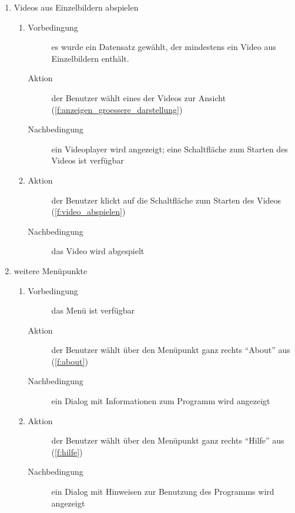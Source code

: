 \begin{enumerate} [label=\bfseries /TS \arabic*0/, leftmargin=*]
	\item Videos aus Einzelbildern abspielen \label{ts:video_abspielen}
	\begin{enumerate}[leftmargin=0pt]
		\item
		\begin{description}
			\item[Vorbedingung] es wurde ein Datensatz gewählt, der mindestens ein Video aus Einzelbildern enthält.
			\item[Aktion] der Benutzer wählt eines der Videos zur Ansicht (\ref{f:anzeigen_groessere_darstellung})
			\item[Nachbedingung] ein Videoplayer wird angezeigt; eine Schaltfläche zum Starten des Videos ist verfügbar
		\end{description}
		\item
		\begin{description}
			\item[Aktion] der Benutzer klickt auf die Schaltfläche zum Starten des Videos (\ref{f:video_abspielen})
			\item[Nachbedingung] das Video wird abgespielt
		\end{description}
	\end{enumerate}

	\item weitere Menüpunkte \label{ts:weitere_menuepunkte}
	\begin{enumerate}[leftmargin=0pt]
		\item
		\begin{description}
			\item[Vorbedingung] das Menü ist verfügbar
			\item[Aktion] der Benutzer wählt über den Menüpunkt ganz rechts \enquote{About} aus (\ref{f:about})
			\item[Nachbedingung] ein \gls{Dialog} mit Informationen zum Programm wird angezeigt
		\end{description}
		\item
		\begin{description}
			\item[Aktion] der Benutzer wählt über den Menüpunkt ganz rechts \enquote{Hilfe} aus (\ref{f:hilfe})
			\item[Nachbedingung] ein \gls{Dialog} mit Hinweisen zur Benutzung des Programms wird angezeigt
		\end{description}
	\end{enumerate}
\end{enumerate}

